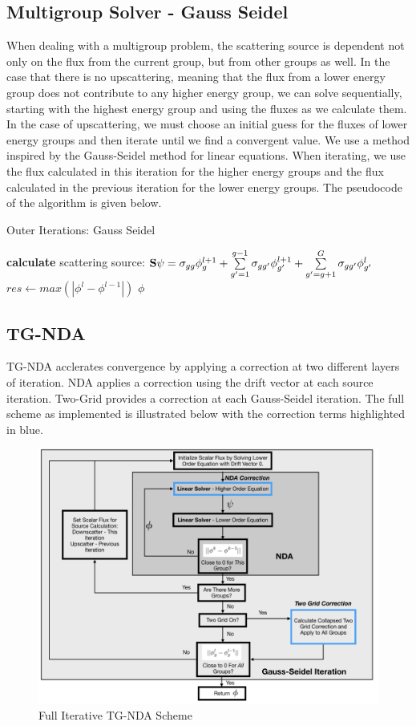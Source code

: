 \subsection{Multigroup Solver - Gauss Seidel}
When dealing with a multigroup problem, the scattering source is dependent not only on the flux from the current group, but from other groups as well. In the case that there is no upscattering, meaning that the flux from a lower energy group does not contribute to any higher energy group, we can solve sequentially, starting with the highest energy group and using the fluxes as we calculate them. In the case of upscattering, we must choose an initial guess for the fluxes of lower energy groups and then iterate until we find a convergent value. We use a method inspired by the Gauss-Seidel method for linear equations. When iterating, we use the flux calculated in this iteration for the higher energy groups and the flux calculated in the previous iteration for the lower energy groups. The pseudocode of the algorithm is given below. 
\begin{algorithm}
\caption{Outer Iterations: Gauss Seidel}
\begin{algorithmic}
     
            \State \textbf{calculate} scattering source: \State $ {\bf S} \psi = \sigma_{gg}\phi_g^{l+1} + \sum\limits_{g'=1}^{g-1} \sigma_{gg'} \phi_{g'}^{l+1} + \sum\limits_{g'=g+1}^G \sigma_{gg'}\phi_{g'}^l$
        \EndProcedure
        \EndFor
        \State $res \gets max(|\phi^{l} - \phi^{l-1}|)$  
        \EndWhile
    \Return $\phi$
\end{algorithmic}
\end{algorithm}

\subsection{TG-NDA}
TG-NDA acclerates convergence by applying a correction at two different layers of iteration. NDA applies a correction using the drift vector at each source iteration. Two-Grid provides a correction at each Gauss-Seidel iteration. The full scheme as implemented is illustrated below with the correction terms highlighted in blue. 


\begin{figure}[H]
    \centering
    \includegraphics[width=\textwidth]{fig/TGNDAchart.png}
    \caption{Full Iterative TG-NDA Scheme}
    \label{fig:tgnda-graph}
\end{figure}